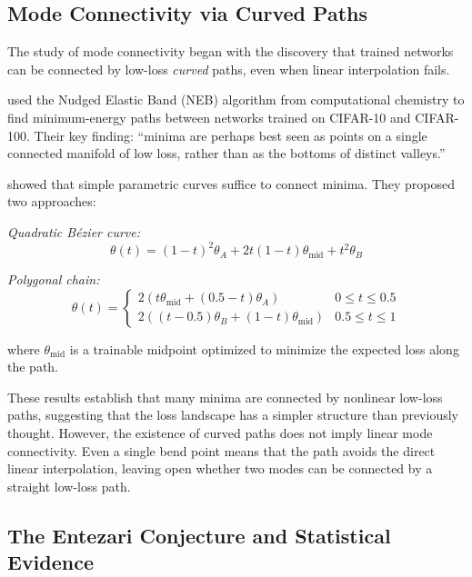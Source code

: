 \documentclass[11pt,a4paper]{report}
\begin{document}
\subsection{Mode Connectivity via Curved Paths}

The study of mode connectivity began with the discovery that trained networks can be connected by low-loss \textit{curved} paths, even when linear interpolation fails.

\citet{draxler2018essentially} used the Nudged Elastic Band (NEB) algorithm from computational chemistry to find minimum-energy paths between networks trained on CIFAR-10 and CIFAR-100. Their key finding: ``minima are perhaps best seen as points on a single connected manifold of low loss, rather than as the bottoms of distinct valleys.''

\citet{garipov2018loss} showed that simple parametric curves suffice to connect minima. They proposed two approaches:

\textit{Quadratic Bézier curve:}
\begin{equation}
\label{eq:bezier}
\theta(t) = (1-t)^2 \theta_A + 2t(1-t)\theta_{\text{mid}} + t^2 \theta_B
\end{equation}

\textit{Polygonal chain:}
\begin{equation}
\theta(t) = \begin{cases}
2(t\theta_{\text{mid}} + (0.5 - t)\theta_A) & 0 \leq t \leq 0.5 \\
2((t - 0.5)\theta_B + (1 - t)\theta_{\text{mid}}) & 0.5 \leq t \leq 1
\end{cases}
\end{equation}

where $\theta_{\text{mid}}$ is a trainable midpoint optimized to minimize the expected loss along the path.

These results establish that many minima are connected by nonlinear low-loss paths, 
suggesting that the loss landscape has a simpler structure than previously thought. 
However, the existence of curved paths does not imply linear mode connectivity. 
Even a single bend point means that the path avoids the direct linear interpolation, 
leaving open whether two modes can be connected by a straight low-loss path.



\subsection{The Entezari Conjecture and Statistical Evidence}
\end{document}
